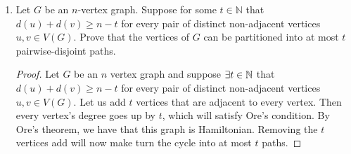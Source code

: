 \documentclass[12pt]{article}
\begin{document}
\begin{enumerate}
\item Let $G$ be an $n$-vertex graph. Suppose for some $t \in \mathbb N$ that $d(u) + d(v) \geq n-t$ for every pair of distinct non-adjacent vertices $u,v \in V(G)$. Prove that the vertices of $G$ can be partitioned into at most $t$ pairwise-disjoint paths.
\begin{proof}
	Let $G$ be an $n$ vertex graph and suppose $\exists t \in \mathbb{N}$ that $d(u) + d(v) \geq n-t$ for every pair of distinct non-adjacent vertices $u,v \in V(G)$. Let us add $t$ vertices that are adjacent to every vertex. Then every vertex's degree goes up by $t$, which will satisfy Ore's condition.  By Ore's theorem, we have that this graph is Hamiltonian. Removing the $t$ vertices add will now make turn the cycle into at most $t$ paths.
\end{proof}
\end{enumerate}
\end{document}
